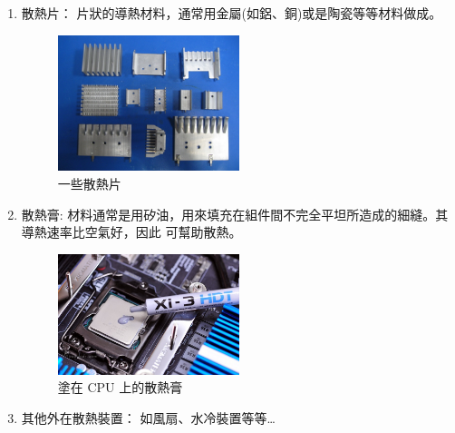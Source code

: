 \documentclass[12pt, a4paper]{article}
\begin{document}
\begin{enumerate}[itemsep=20pt, topsep=10pt]
  \begin{enumerate}
    \item 散熱片： 片狀的導熱材料，通常用金屬(如鋁、銅)或是陶瓷等等材料做成。 

      \begin{minipage}[t]{\linewidth}
        \centering
        \begin{figure}[H]
        \centering
        \includegraphics[width=0.5\textwidth]{p1.pdf}
        \caption{一些散熱片}
      \end{figure}
      \end{minipage}
    \item 散熱膏: 材料通常是用矽油，用來填充在組件間不完全平坦所造成的細縫。其導熱速率比空氣好，因此
      可幫助散熱。 \par
      \begin{minipage}[t]{\linewidth}
        \centering
        \begin{figure}[H]
        \centering
        \includegraphics[width=0.5\textwidth]{p2.pdf}
        \caption{塗在 CPU 上的散熱膏}
      \end{figure}
      \end{minipage}
    \item 其他外在散熱裝置： 如風扇、水冷裝置等等… \par
      \begin{minipage}[t]{\linewidth}
        \centering
        \begin{figure}[H]
        \centering
        \begin{subfigure}{0.49\textwidth}
          \centering

\end{subfigure}
\end{figure}
\end{minipage}
\end{enumerate}
\end{enumerate}
\end{document}
